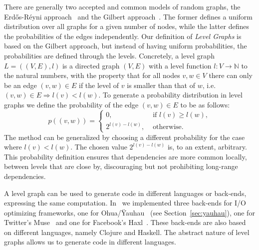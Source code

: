 There are generally two accepted and common models of random graphs, the Erd\H{o}s-R\'{e}yni approach~\cite{erdosreyni} and the Gilbert approach~\cite{gilbert1959random}.
The former defines a uniform distribution over all graphs for a given number of nodes, while the latter defines the probabilities of the edges independently.
Our definition of \emph{Level Graphs} is based on the Gilbert approach, but instead of having uniform probabilities, the probabilities are defined through the levels.
Concretely, a level graph $L = ((V,E),l)$ is a directed graph $(V,E)$ with a level function $l : V \rightarrow \mathbb{N}$ to the natural numbers, with the property that for all nodes $v,w \in V$ there can only be an edge $(v,w) \in E$ if the level of $v$ is smaller than that of $w$, i.e. $(v,w) \in E \Rightarrow l(v) < l(w)$.
To generate a probability distribution in level graphs we define the probability of the edge $(v,w) \in E$ to be as follows:
\[  p( (v,w) ) = \left\{
    \begin{array}{ll}
      0, & \text{ if } l(v) \geq l(w), \\
      2^{l(v)-l(w)}, & \text{ otherwise.}
    \end{array} \right. \]
The method can be generalized by choosing a different probability for the case where $l(v) < l(w)$.
The chosen value $2^{l(v)-l(w)}$ is, to an extent, arbitrary.
This probability definition ensures that dependencies are more common locally, between levels that are close by, discouraging but not prohibiting long-range dependencies.

A level graph can be used to generate code in different languages or back-ends, expressing the same computation.
In~\cite{goens_multiprog18} we implemented three back-ends for \ac{I/O} optimizing frameworks, one for Ohua/\"{Y}auhau~\cite{ertel_cc18} (see Section~\ref{sec:yauhau}), one for Twitter's Muse~\cite{muse} and one for Facebook's Haxl~\cite{marlow2014haxl}.
These back-ends are also based on different languages, namely Clojure and Haskell.
The abstract nature of level graphs allows us to generate code in different languages.